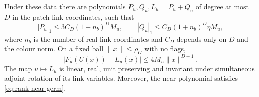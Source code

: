 \begin{lemma}
\label{lem:rank-list-taylor}
Under these data there are polynomials $P_u,Q_u,L_u=P_u+Q_u$ of
degree at most $D$ in the patch link coordinates, such that
\[
 |P_u|_1\le3C_D(1+n_b)^D M_u,\qquad
 |Q_u|_1\le C_D(1+n_b)^D\eta M_u,
\]
where $n_b$ is the number of real link coordinates and $C_D$ depends
only on $D$ and the colour norm. On a fixed ball $\|x\|\le\rho_G$
with no flags,
\begin{equation}\label{eq:rank-list-taylor-error}
 |F_u(U(x))-L_u(x)|\le4M_u\|x\|^{D+1}.
\end{equation}
The map $u\mapsto L_u$ is linear, real, unit preserving and invariant
under simultaneous adjoint rotation of its link variables. Moreover,
the near polynomial satisfies \eqref{eq:rank-near-germ}.
\end{lemma}

